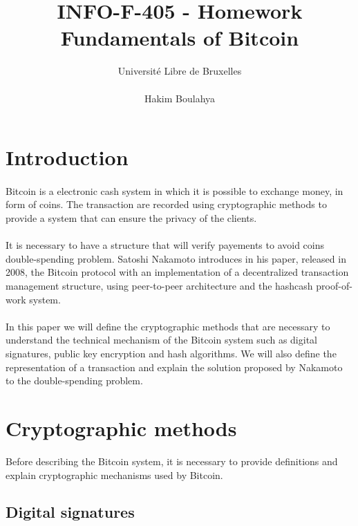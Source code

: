 \documentclass[letterpaper]{article}
\title{INFO-F-405 - Homework \\ Fundamentals of Bitcoin}
\author{Université Libre de Bruxelles \\
\\ Hakim Boulahya}
\begin{document}
\maketitle


\section*{Introduction}

\paragraph{}
Bitcoin is a electronic cash system in which it is possible to exchange
money, in form of coins.
The transaction are recorded
using cryptographic methods to provide a system that
can ensure the privacy of the clients.

\paragraph{}
It is necessary to have a structure that will verify payements to
avoid coins double-spending problem. Satoshi Nakamoto introduces
in his paper\cite{bitcoin}, released in 2008, the Bitcoin protocol
with an implementation of a decentralized transaction management structure,
using peer-to-peer architecture and the hashcash\cite{hashcash}
proof-of-work system.

\paragraph{}
In this paper we will define the cryptographic methods that are necessary
to understand the technical mechanism of the Bitcoin system
such as digital signatures,
public key encryption and hash algorithms. We will also define the
representation of a transaction and explain the solution proposed
by Nakamoto\cite{bitcoin} to the double-spending problem.

\section{Cryptographic methods}
Before describing the Bitcoin system, it is necessary to provide definitions
and explain cryptographic mechanisms used by Bitcoin.

\subsection{Digital signatures}
\end{document}
